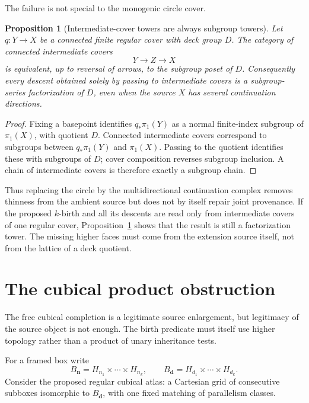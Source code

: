 \documentclass[11pt]{article}
\newtheorem{proposition}[theorem]{Proposition}
\begin{document}
The failure is not special to the monogenic circle cover.

\begin{proposition}[Intermediate-cover towers are always subgroup towers]
\label{prop:cover-subgroup}
Let \(q:Y\to X\) be a connected finite regular cover with deck group \(D\).
The category of connected intermediate covers
\[
Y\longrightarrow Z\longrightarrow X
\]
is equivalent, up to reversal of arrows, to the subgroup poset of \(D\).
Consequently every descent obtained solely by passing to intermediate covers
is a subgroup-series factorization of \(D\), even when the source \(X\) has
several continuation directions.
\end{proposition}

\begin{proof}
Fixing a basepoint identifies \(q_*\pi_1(Y)\) as a normal finite-index subgroup
of \(\pi_1(X)\), with quotient \(D\).  Connected intermediate covers correspond
to subgroups between \(q_*\pi_1(Y)\) and \(\pi_1(X)\).  Passing to the quotient
identifies these with subgroups of \(D\); cover composition reverses subgroup
inclusion.  A chain of intermediate covers is therefore exactly a subgroup
chain.
\end{proof}

Thus replacing the circle by the multidirectional continuation complex removes
thinness from the ambient source but does not by itself repair joint
provenance.  If the proposed \(k\)-birth and all its descents are read only from
intermediate covers of one regular cover, Proposition~\ref{prop:cover-subgroup}
shows that the result is still a factorization tower.  The missing higher faces
must come from the extension source itself, not from the lattice of a deck
quotient.

\section{The cubical product obstruction}

The free cubical completion is a legitimate source enlargement, but legitimacy
of the source object is not enough.  The birth predicate must itself use
higher topology rather than a product of unary inheritance tests.

For a framed box write
\[
B_{\mathbf n}=H_{n_1}\times\cdots\times H_{n_k},
\qquad
B_{\mathbf d}=H_{d_1}\times\cdots\times H_{d_k}.
\]
Consider the proposed regular cubical atlas: a Cartesian grid of consecutive
subboxes isomorphic to \(B_{\mathbf d}\), with one fixed matching of
parallelism classes.
\end{document}

